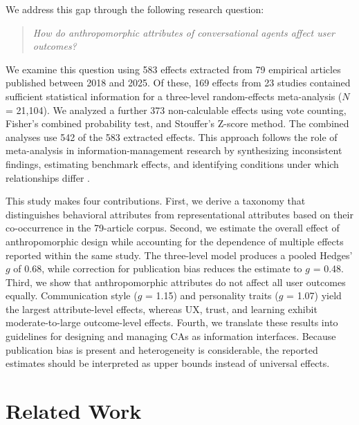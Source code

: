 \documentclass[preprint,review,12pt,authoryear,nonatbib]{elsarticle}
\begin{document}
We address this gap through the following research question:

\begin{quote}
\textit{How do anthropomorphic attributes of conversational agents affect user outcomes?}
\end{quote}

We examine this question using 583 effects extracted from 79 empirical articles published between 2018 and 2025. Of these, 169 effects from 23 studies contained sufficient statistical information for a three-level random-effects meta-analysis ($N$ = 21,104). We analyzed a further 373 non-calculable effects using vote counting, Fisher's combined probability test, and Stouffer's Z-score method. The combined analyses use 542 of the 583 extracted effects. This approach follows the role of meta-analysis in information-management research by synthesizing inconsistent findings, estimating benchmark effects, and identifying conditions under which relationships differ \parencite{mou_cohen_2024}.

This study makes four contributions. First, we derive a taxonomy that distinguishes behavioral attributes from representational attributes based on their co-occurrence in the 79-article corpus. Second, we estimate the overall effect of anthropomorphic design while accounting for the dependence of multiple effects reported within the same study. The three-level model produces a pooled Hedges' $g$ of 0.68, while correction for publication bias reduces the estimate to $g$ = 0.48. Third, we show that anthropomorphic attributes do not affect all user outcomes equally. Communication style ($g$ = 1.15) and personality traits ($g$ = 1.07) yield the largest attribute-level effects, whereas UX, trust, and learning exhibit moderate-to-large outcome-level effects. Fourth, we translate these results into guidelines for designing and managing CAs as information interfaces. Because publication bias is present and heterogeneity is considerable, the reported estimates should be interpreted as upper bounds instead of universal effects.

\section{Related Work}

\end{document}
